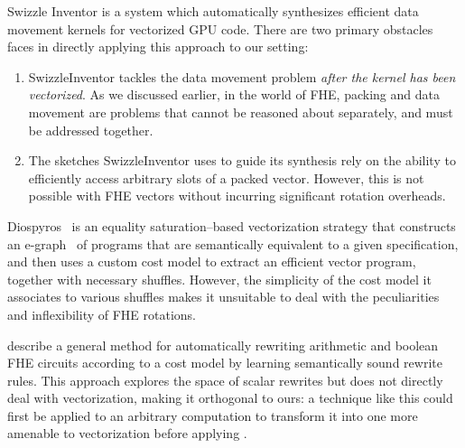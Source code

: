Swizzle Inventor \cite{SwizzleInventor} is a system which automatically synthesizes efficient data movement kernels for vectorized GPU code.
There are two primary obstacles \system faces in directly applying this approach to our setting:
\begin{enumerate}
    \item SwizzleInventor tackles the data movement problem {\em after the kernel has been vectorized}. As we discussed earlier, in the world of FHE, packing and data movement are problems that cannot be reasoned about separately, and must be addressed together.
    \item The sketches SwizzleInventor uses to guide its synthesis rely on the ability to efficiently access arbitrary slots of a packed vector. However, this is not possible with FHE vectors without incurring significant rotation overheads.
\end{enumerate}

Diospyros~\cite{Diospyros} is an equality saturation--based vectorization strategy that constructs an e-graph~\cite{EqualitySaturation, egg} of programs that are semantically equivalent to a given specification, and then uses a custom cost model to extract an efficient vector program, together with necessary shuffles.
However, the simplicity of the cost model it associates to various shuffles makes it unsuitable to deal with the peculiarities and inflexibility of FHE rotations.

\citet{CircuitRewriting} describe a general method for automatically rewriting arithmetic and boolean FHE circuits according to a cost model by learning semantically sound rewrite rules.
This approach explores the space of scalar rewrites but does not directly deal with vectorization, making it orthogonal to ours: a technique like this could first be applied to an arbitrary computation to transform it into one more amenable to vectorization before applying \system.

